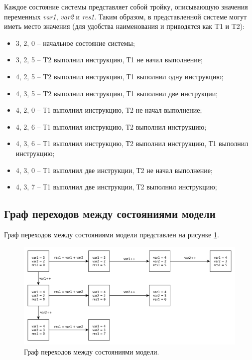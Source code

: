 Каждое состояние системы представляет собой тройку, описывающую значения переменных \textit{var1}, \textit{var2} и \textit{res1}. Таким образом, в представленной системе могут иметь место значения (для удобства наименования  и  приводятся как T1 и T2):

\begin{itemize}
	\item 3, 2, 0 -- начальное состояние системы;
	\item 3, 2, 5 -- T2 выполнил инструкцию, Т1 не начал выполнение;
	\item 4, 2, 5 -- T2 выполнил инструкцию, Т1 выполнил одну инструкцию;
	\item 4, 3, 5 -- T2 выполнил инструкцию, Т1 выполнил две инструкции;
	\item 4, 2, 0 -- Т1 выполнил инструкцию, Т2 не начал выполнение;
	\item 4, 2, 6 -- Т1 выполнил инструкцию, Т2 выполнил инструкцию;
	\item 4, 3, 6 -- Т1 выполнил инструкцию, Т2 выполнил инструкцию, Т1 выполнил инструкцию;
	\item 4, 3, 0 -- Т1 выполнил две инструкции, Т2 не начал выполнение;
	\item 4, 3, 7 -- Т1 выполнил две инструкции, Т2 выполнил инструкцию;
\end{itemize}

\subsection{Граф переходов между состояниями модели}

Граф переходов между состояниями модели представлен на рисунке \ref{img:trans}.

\begin{figure}[H]
	\centering
	\includegraphics[width=\textwidth]{inc/trans.pdf}
	\caption{ Граф переходов между состояниями модели. }
	\label{img:trans}
\end{figure}

\pagebreak